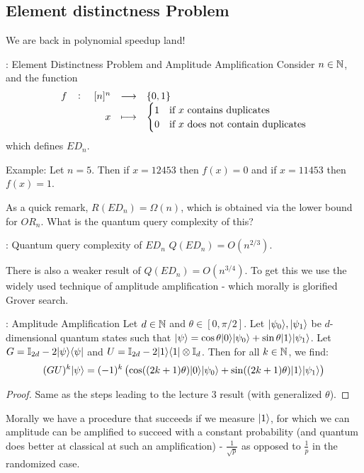 \subsection*{Element distinctness Problem}
We are back in polynomial speedup land!

\begin{defbox}{: Element Distinctness Problem and Amplitude Amplification}
    Consider $n \in \mathbb{N}$, and the function
\begin{equation}
    \fullfunction{f}{[n]^n}{\set{0, 1}}{x}{\begin{cases} 1 & \text{if $x$ contains duplicates} \\ 0 & \text{if $x$ does not contain duplicates}\end{cases}}
\end{equation}
which defines $ED_n$.
\end{defbox}

Example: Let $n = 5$. Then if $x = 12453$ then $f(x) = 0$ and if $x = 11453$ then $f(x) = 1$. 

As a quick remark, $R(ED_n) = \Omega(n)$, which is obtained via the lower bound for $OR_n$. What is the quantum query complexity of this? 

\begin{propbox}{: Quantum query complexity of $ED_n$}
    $Q(ED_n) = O(n^{2/3})$.
\end{propbox}
There is also a weaker result of $Q(ED_n) = O(n^{3/4})$. To get this we use the widely used technique of amplitude amplification - which morally is glorified Grover search.

\begin{propbox}{: Amplitude Amplification}
    Let $d \in \mathbb{N}$ and $\theta \in [0, \pi/2]$. Let $\lvert \psi_0 \rangle, \lvert \psi_1 \rangle$ be $d$-dimensional quantum states such that $\lvert \psi \rangle = \cos\theta\lvert 0 \rangle\lvert \psi_0 \rangle + \sin\theta\lvert 1 \rangle\lvert \psi_1 \rangle$. Let $G = \mathbb{I}_{2d} - 2\lvert \psi \rangle \langle \psi \rvert$ and $U = \mathbb{I}_{2d} - 2\lvert 1 \rangle \langle 1 \rvert \otimes \mathbb{I}_d$. Then for all $k \in \mathbb{N}$, we find:
    \begin{equation}
        (GU)^k\lvert \psi \rangle = (-1)^k\left(\cos((2k+1)\theta)\lvert 0 \rangle\lvert \psi_0 \rangle + \sin((2k+1)\theta)\lvert 1 \rangle\lvert \psi_1 \rangle\right)
    \end{equation}
\end{propbox}
\begin{proof}
    Same as the steps leading to the lecture 3 result (with generalized $\theta$).
\end{proof}
Morally we have a procedure that succeeds if we measure $\lvert 1 \rangle$, for which we can amplitude can be amplified to succeed with a constant probability (and quantum does better at classical at such an amplification) - $\frac{1}{\sqrt{p}}$ as opposed to $\frac{1}{p}$ in the randomized case.

